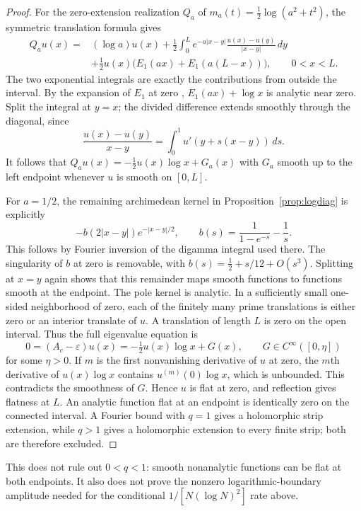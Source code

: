 \begin{proof}
For the zero-extension realization $Q_a$ of
$m_a(t)=\tfrac12\log(a^2+t^2)$, the symmetric translation formula gives
\begin{align*}
 Q_a u(x)={}&(\log a)u(x)
 +\frac12\int_0^L e^{-a|x-y|}\frac{u(x)-u(y)}{|x-y|}\,dy\\
 &+\frac12u(x)\bigl(E_1(ax)+E_1(a(L-x))\bigr),\qquad 0<x<L.
\end{align*}
The two exponential integrals are exactly the contributions from outside
the interval. By the expansion of $E_1$ at zero
\cite[eq.~6.6.2]{DLMF}, $E_1(ax)+\log x$ is analytic near zero.
Split the integral at $y=x$; the divided difference extends smoothly
through the diagonal, since
\[
 \frac{u(x)-u(y)}{x-y}=\int_0^1u'(y+s(x-y))\,ds.
\]
It follows that $Q_au(x)=-\tfrac12u(x)\log x+G_a(x)$ with $G_a$
smooth up to the left endpoint whenever $u$ is smooth on $[0,L]$.

For $a=1/2$, the remaining archimedean kernel in
Proposition~\ref{prop:logdiag} is explicitly
\[
 -b(2|x-y|)e^{-|x-y|/2},\qquad
 b(s)=\frac1{1-e^{-s}}-\frac1s.
\]
This follows by Fourier inversion of the digamma integral used there.
The singularity of $b$ at zero is removable, with
$b(s)=\tfrac12+s/12+O(s^3)$. Splitting at $x=y$ again shows that this
remainder maps smooth functions to functions smooth at the endpoint.
The pole kernel is analytic. In a sufficiently small one-sided neighborhood
of zero, each of the finitely many prime translations is either zero or
an interior translate of $u$. A translation of length $L$ is zero on the
open interval. Thus the full eigenvalue equation is
\[
 0=(A_c-\varepsilon)u(x)=-\tfrac12u(x)\log x+G(x),
 \qquad G\in C^\infty([0,\eta])
\]
for some $\eta>0$. If $m$ is the first nonvanishing derivative of $u$ at
zero, the $m$th derivative of $u(x)\log x$ contains
$u^{(m)}(0)\log x$, which is unbounded. This contradicts the smoothness
of $G$. Hence $u$ is flat at zero, and reflection gives flatness at $L$.
An analytic function flat at an endpoint is identically zero on the
connected interval. A Fourier bound with $q=1$ gives a holomorphic strip
extension, while $q>1$ gives a holomorphic extension to every finite strip;
both are therefore excluded.
\end{proof}

This does not rule out $0<q<1$: smooth nonanalytic functions can be flat at
both endpoints. It also does not prove the nonzero logarithmic-boundary
amplitude needed for the conditional $1/[N(\log N)^2]$ rate above.


